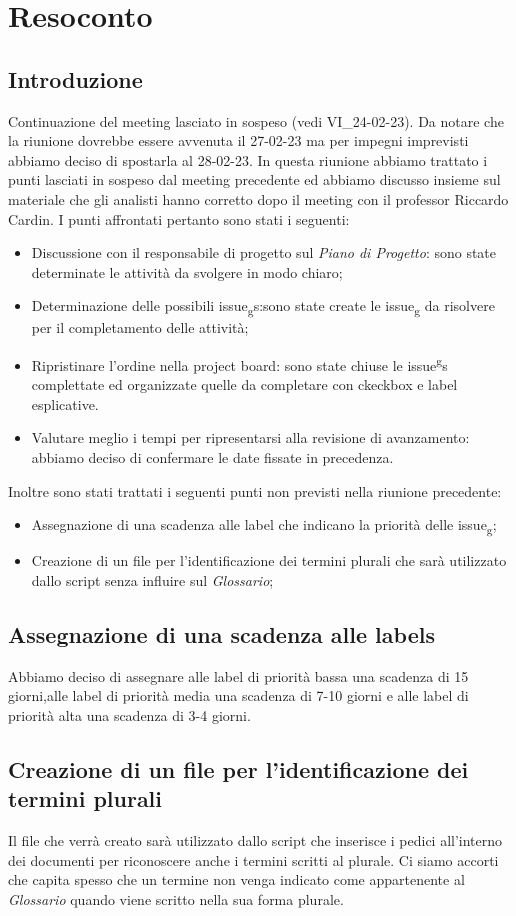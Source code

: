 \section{Resoconto}
\subsection{Introduzione}
Continuazione del meeting lasciato in sospeso (vedi VI\_24-02-23).
Da notare che la riunione dovrebbe essere avvenuta il 27-02-23 ma per impegni imprevisti abbiamo deciso di spostarla al 28-02-23.
In questa riunione abbiamo trattato i punti lasciati in sospeso dal meeting precedente ed abbiamo discusso insieme sul materiale che
gli analisti hanno corretto dopo il meeting con il professor Riccardo Cardin.
I punti affrontati pertanto sono stati i seguenti:
\begin{itemize}
    \item Discussione con il responsabile di progetto sul \textit{Piano di Progetto}: sono state determinate le attività da svolgere in modo chiaro;
    \item Determinazione delle possibili issue\textsubscript{g}s:sono state create le issue\textsubscript{g} da risolvere per il completamento delle attività;
    \item Ripristinare l'ordine nella project board: sono state chiuse le issue\textsuperscript{g}s complettate ed organizzate quelle da completare con ckeckbox e label esplicative.
    \item Valutare meglio i tempi per ripresentarsi alla revisione di avanzamento: abbiamo deciso di confermare le date fissate in precedenza.
    \end{itemize}
Inoltre sono stati trattati i seguenti punti non previsti nella riunione precedente:
\begin{itemize}
\item Assegnazione di una scadenza alle label che indicano la priorità delle issue\textsubscript{g};
\item Creazione di un file per l'identificazione dei termini plurali che sarà utilizzato dallo script senza influire sul \textit{Glossario};
\end{itemize}
\subsection{Assegnazione di una scadenza alle labels}
Abbiamo deciso di assegnare alle label di priorità bassa una scadenza di 15 giorni,alle label di priorità media una scadenza di 7-10 giorni e alle 
label di priorità alta una scadenza di 3-4 giorni.
\subsection{Creazione di un file per l'identificazione dei termini plurali}
Il file che verrà creato sarà utilizzato dallo script che inserisce i pedici all'interno dei documenti per riconoscere anche i termini scritti al 
plurale. Ci siamo accorti che capita spesso che un termine non venga indicato come appartenente al \textit{Glossario} quando viene scritto nella 
sua forma plurale.